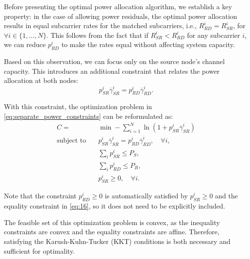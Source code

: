 \documentclass[lettersize,journal]{IEEEtran}
\begin{document}
	Before presenting the optimal power allocation algorithm, we establish a key property: in the case of allowing power residuals, the optimal power allocation results in equal subcarrier rates for the matched subcarriers, i.e., \( R_{RD}^{i} = R_{SR}^{i} \), for \( \forall i \in \{1, \dots, N\} \). This follows from the fact that if \( R_{SR}^i < R_{RD}^i \) for any subcarrier \( i \), we can reduce \( p_{RD}^i \) to make the rates equal without affecting system capacity.
	
	Based on this observation, we can focus only on the source node's channel capacity. This introduces an additional constraint that relates the power allocation at both nodes:
	\begin{equation}
		p_{SR}^i \overline{\gamma}_{SR}^i = p_{RD}^i \overline{\gamma}_{RD}^i .  
		\label{eq:16}
	\end{equation}
	
	With this constraint, the optimization problem in \eqref{eq:separate_power_constraints} can be reformulated as:
	\begin{equation}
		\begin{aligned}
			C = & \min - \sum_{i=1}^{N} \ln \left( 1 + p_{SR}^i \overline{\gamma}_{SR}^i \right) \\
			\text{subject to} \quad & p_{SR}^i \overline{\gamma}_{SR}^i = p_{RD}^i \overline{\gamma}_{RD}^i, \quad \forall i, \\
			& \sum_{i} p_{SR}^i \leq P_S, \\
			& \sum_{i} p_{RD}^i \leq P_R, \\
			& p_{SR}^i \geq 0, \quad \forall i.
		\end{aligned}
		\label{eq:opt_power_allocation}
	\end{equation}
	
	Note that the constraint \( p_{RD}^i \geq 0 \) is automatically satisfied by \( p_{SR}^i \geq 0 \) and the equality constraint in \eqref{eq:16}, so it does not need to be explicitly included.
	
	The feasible set of this optimization problem is convex, as the inequality constraints are convex and the equality constraints are affine. Therefore, satisfying the Karush-Kuhn-Tucker (KKT) conditions is both necessary and sufficient for optimality.
	
\end{document}

